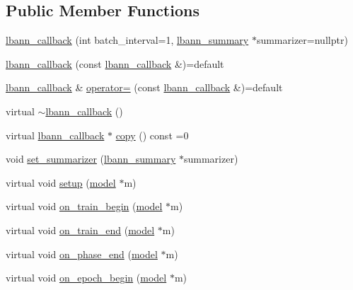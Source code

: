 \subsection*{Public Member Functions}
\begin{DoxyCompactItemize}
\item 
\hyperlink{classlbann_1_1lbann__callback_a679057298a41ddd47f08c157f756c584}{lbann\+\_\+callback} (int batch\+\_\+interval=1, \hyperlink{classlbann_1_1lbann__summary}{lbann\+\_\+summary} $\ast$summarizer=nullptr)
\item 
\hyperlink{classlbann_1_1lbann__callback_a91d994616b8bf98685ac32939228f96a}{lbann\+\_\+callback} (const \hyperlink{classlbann_1_1lbann__callback}{lbann\+\_\+callback} \&)=default
\item 
\hyperlink{classlbann_1_1lbann__callback}{lbann\+\_\+callback} \& \hyperlink{classlbann_1_1lbann__callback_a66b0a8c00a273669fa782ece59e8898b}{operator=} (const \hyperlink{classlbann_1_1lbann__callback}{lbann\+\_\+callback} \&)=default
\item 
virtual \hyperlink{classlbann_1_1lbann__callback_ac91abaec389f8d2547512c45ae587304}{$\sim$lbann\+\_\+callback} ()
\item 
virtual \hyperlink{classlbann_1_1lbann__callback}{lbann\+\_\+callback} $\ast$ \hyperlink{classlbann_1_1lbann__callback_a9f545d1269a8c7af335625d049691f26}{copy} () const =0
\item 
void \hyperlink{classlbann_1_1lbann__callback_a02d924df2f8ca851578dc76d9015e48d}{set\+\_\+summarizer} (\hyperlink{classlbann_1_1lbann__summary}{lbann\+\_\+summary} $\ast$summarizer)
\item 
virtual void \hyperlink{classlbann_1_1lbann__callback_aab5086e27d9bb0a7c7ee8ffc1bc58671}{setup} (\hyperlink{classlbann_1_1model}{model} $\ast$m)
\item 
virtual void \hyperlink{classlbann_1_1lbann__callback_a7c8f0d211967ccc5219144e92571ab26}{on\+\_\+train\+\_\+begin} (\hyperlink{classlbann_1_1model}{model} $\ast$m)
\item 
virtual void \hyperlink{classlbann_1_1lbann__callback_af28078b0ddaef45124465bef01eefedf}{on\+\_\+train\+\_\+end} (\hyperlink{classlbann_1_1model}{model} $\ast$m)
\item 
virtual void \hyperlink{classlbann_1_1lbann__callback_ace7452239c9ad7aa6247e9496adbcffe}{on\+\_\+phase\+\_\+end} (\hyperlink{classlbann_1_1model}{model} $\ast$m)
\item 
virtual void \hyperlink{classlbann_1_1lbann__callback_a4ed9498763412a55953fff71ee3a9456}{on\+\_\+epoch\+\_\+begin} (\hyperlink{classlbann_1_1model}{model} $\ast$m)

\end{DoxyCompactItemize}

